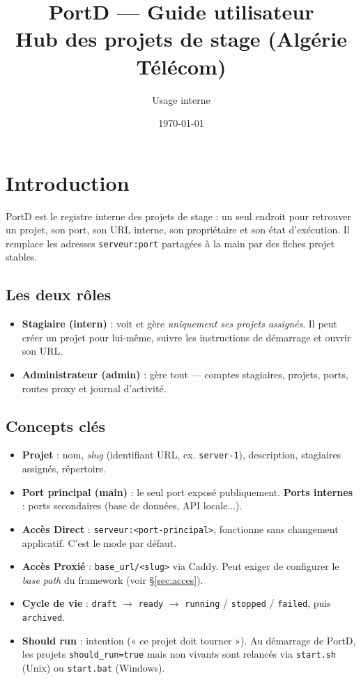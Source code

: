 \documentclass[11pt,a4paper]{article}
\title{PortD — Guide utilisateur\\ \large Hub des projets de stage (Algérie Télécom)}
\author{Usage interne}
\date{\today}
\newcommand{\chemin}[1]{\texttt{#1}}
\begin{document}
\maketitle
\tableofcontents
\newpage

\section{Introduction}

PortD est le registre interne des projets de stage : un seul endroit pour
retrouver un projet, son port, son URL interne, son propriétaire et son état
d'exécution. Il remplace les adresses \chemin{serveur:port} partagées à la main
par des fiches projet stables.

\subsection{Les deux rôles}
\begin{itemize}[leftmargin=*]
  \item \textbf{Stagiaire (intern)} : voit et gère \emph{uniquement ses projets assignés}. Il peut créer un projet pour lui-même, suivre les instructions de démarrage et ouvrir son URL.
  \item \textbf{Administrateur (admin)} : gère tout — comptes stagiaires, projets, ports, routes proxy et journal d'activité.
\end{itemize}

\subsection{Concepts clés}
\begin{itemize}[leftmargin=*]
  \item \textbf{Projet} : nom, \emph{slug} (identifiant URL, ex. \chemin{server-1}), description, stagiaires assignés, répertoire.
  \item \textbf{Port principal (main)} : le seul port exposé publiquement. \textbf{Ports internes} : ports secondaires (base de données, API locale...).
  \item \textbf{Accès Direct} : \chemin{serveur:<port-principal>}, fonctionne sans changement applicatif. C'est le mode par défaut.
  \item \textbf{Accès Proxié} : \chemin{base\_url/<slug>} via Caddy. Peut exiger de configurer le \emph{base path} du framework (voir §\ref{sec:acces}).
  \item \textbf{Cycle de vie} : \texttt{draft} $\rightarrow$ \texttt{ready} $\rightarrow$ \texttt{running} / \texttt{stopped} / \texttt{failed}, puis \texttt{archived}.
  \item \textbf{Should run} : intention (« ce projet doit tourner »). Au démarrage de PortD, les projets \texttt{should\_run=true} mais non vivants sont relancés via \chemin{start.sh} (Unix) ou \chemin{start.bat} (Windows).
\end{itemize}
\end{document}
